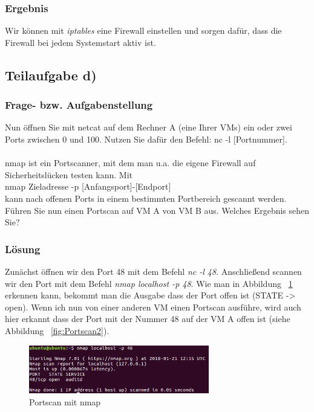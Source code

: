 \subsubsection{Ergebnis}

Wir können mit \textit{iptables} eine Firewall einstellen und sorgen dafür, dass die Firewall bei jedem Systemstart aktiv ist.

\subsection{Teilaufgabe d)} \cite{3}

\subsubsection{Frage- bzw. Aufgabenstellung}

Nun öffnen Sie mit netcat auf dem Rechner A (eine Ihrer VMs) ein oder zwei Ports zwischen 0 und 100. Nutzen Sie dafür den Befehl: nc -l [Portnummer].\\
\\
nmap ist ein Portscanner, mit dem man u.a. die eigene Firewall auf Sicherheitslücken testen kann. Mit \\
nmap Zieladresse -p [Anfangsport]-[Endport] \\
kann nach offenen Ports in einem bestimmten Portbereich gescannt werden. Führen Sie nun einen Portscan auf VM A von VM B aus. Welches Ergebnis sehen Sie?

\subsubsection{Lösung}

Zunächst öffnen wir den Port 48 mit dem Befehl \textit{nc -l 48}. Anschließend scannen wir den Port mit dem Befehl \textit{nmap localhost -p 48}. Wie man in Abbildung ~\ref{fig:Portscan} erkennen kann, bekommt man die Ausgabe dass der Port offen ist (STATE -> open). Wenn ich nun von einer anderen VM einen Portscan ausführe, wird auch hier erkannt dass der Port mit der Nummer 48 auf der VM A offen ist (siehe Abbildung ~\ref{fig:Portscan2}). 

\begin{figure}[htbp]
\begin{center}
\includegraphics[width=0.7\textwidth]{Bild2}
\caption{Portscan mit nmap}
\label{fig:Portscan}
\end{center}
\end{figure}

